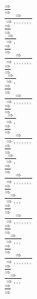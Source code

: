 \documentclass[11pt]{article}
\begin{document}
\begin{center}
\bigskip
\\$\frac{\Rightarrow }{\Rightarrow }$
\bigskip
\\$\frac{\Rightarrow }{\Rightarrow , , , , , , , }$
\bigskip
\\$\frac{\Rightarrow }{\Rightarrow }$
\bigskip
\\$\frac{\Rightarrow }{\Rightarrow , }$
\bigskip
\\$\frac{\Rightarrow }{\Rightarrow }$
\bigskip
\\$\frac{\Rightarrow }{\Rightarrow , , , , , , , }$
\bigskip
\\$\frac{\Rightarrow }{\Rightarrow }$
\bigskip
\\$\frac{\Rightarrow }{\Rightarrow , }$
\bigskip
\\$\frac{\Rightarrow }{\Rightarrow }$
\bigskip
\\$\frac{\Rightarrow }{\Rightarrow , , , , , , , }$
\bigskip
\\$\frac{\Rightarrow }{\Rightarrow }$
\bigskip
\\$\frac{\Rightarrow }{\Rightarrow , }$
\bigskip
\\$\frac{\Rightarrow }{\Rightarrow }$
\bigskip
\\$\frac{\Rightarrow }{\Rightarrow , , , , , , , }$
\bigskip
\\$\frac{\Rightarrow }{\Rightarrow }$
\bigskip
\\$\frac{\Rightarrow }{\Rightarrow , }$
\bigskip
\\$\frac{\Rightarrow }{\Rightarrow }$
\bigskip
\\$\frac{\Rightarrow }{\Rightarrow , , , , , , , }$
\bigskip
\\$\frac{\Rightarrow }{\Rightarrow }$
\bigskip
\\$\frac{\Rightarrow }{\Rightarrow , , , }$
\bigskip
\\$\frac{\Rightarrow }{\Rightarrow }$
\bigskip
\\$\frac{\Rightarrow }{\Rightarrow , , , , , , , }$
\bigskip
\\$\frac{\Rightarrow }{\Rightarrow }$
\bigskip
\\$\frac{\Rightarrow }{\Rightarrow , , , }$
\bigskip
\\$\frac{\Rightarrow }{\Rightarrow }$
\bigskip
\\$\frac{\Rightarrow }{\Rightarrow , , , , , , , }$
\bigskip
\\$\frac{\Rightarrow }{\Rightarrow }$
\bigskip
\\$\frac{\Rightarrow }{\Rightarrow , , , }$
\bigskip
\\$\frac{\Rightarrow }{\Rightarrow }$

\end{center}
\end{document}
